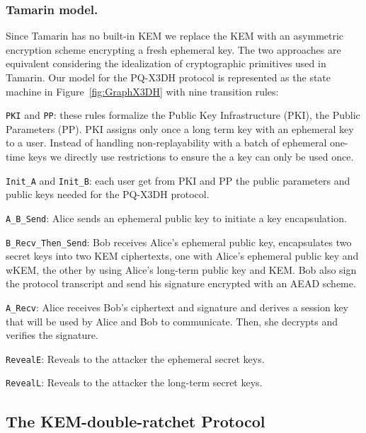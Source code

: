 \subsubsection{Tamarin model.} Since Tamarin has no built-in KEM we replace the KEM with an asymmetric encryption scheme encrypting a fresh ephemeral key. The two approaches are equivalent considering the idealization of cryptographic primitives used in Tamarin. Our model for the PQ-X3DH protocol is represented as the state machine in Figure~\ref{fig:GraphX3DH} with nine transition rules:
\begin{compactitem}
\item \texttt{PKI} and \texttt{PP}: these rules formalize the Public Key Infrastructure (PKI), the Public Parameters (PP). PKI assigns only once a long term key with an ephemeral key to a user. Instead of handling non-replayability with a batch of ephemeral one-time keys we directly use restrictions to ensure the a key can only be used once.
\item \texttt{Init\_A} and \texttt{Init\_B}: each user get from PKI and PP the public parameters and public keys needed for the PQ-X3DH protocol.
\item \texttt{A\_B\_Send}: Alice sends an ephemeral public key to initiate a key encapsulation.
\item \texttt{B\_Recv\_Then\_Send}: Bob receives Alice's ephemeral public key, encapsulates two secret keys into two KEM ciphertexts, one with Alice's ephemeral public key and wKEM, the other by using Alice's long-term public key and KEM. Bob also sign the protocol transcript and send his signature encrypted with an AEAD scheme.
\item \texttt{A\_Recv}: Alice receives Bob's ciphertext and signature and derives a session key that will be used by Alice and Bob to communicate. Then, she decrypts and verifies the signature.
\item \texttt{RevealE}: Reveals to the attacker the ephemeral secret keys.
\item \texttt{RevealL}: Reveals to the attacker the long-term secret keys.
\end{compactitem}

\subsection{The KEM-double-ratchet Protocol}

